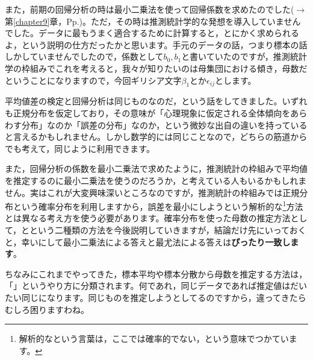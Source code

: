 \documentclass{ltjbook}
\begin{document}
また，前期の回帰分析の時は最小二乗法を使って回帰係数を求めたのでした($\to$第\ref{chapter9}章，Pp.\pageref{LeastSquare})。ただ，その時は推測統計学的な発想を導入していませんでした。データに最もうまく適合するために計算すると，とにかく求められるよ，という説明の仕方だったかと思います。手元のデータの話，つまり標本の話しかしていませんでしたので，係数として$b_0,b_1$と書いていたのですが，推測統計学の枠組みでこれを考えると，我々が知りたいのは母集団における傾き，母数だということになりますので，今回ギリシア文字$\beta_1$とか$\epsilon_{ij}$とします。

平均値差の検定と回帰分析は同じものなのだ，という話をしてきました。いずれも正規分布を仮定しており，その意味が「心理現象に仮定される全体傾向をあらわす分布」なのか「誤差の分布」なのか，という微妙な出自の違いを持っていると言えるかもしれません。しかし数学的には同じことなので，どちらの筋道からでも考えて，同じように利用できます。

また，回帰分析の係数を最小二乗法で求めたように，推測統計の枠組みで平均値を推定するのに最小二乗法を使うのだろうか，と考えている人もいるかもしれません。実はこれが大変興味深いところなのですが，推測統計の枠組みでは正規分布という確率分布を利用しますから，誤差を最小にしようという解析的な\footnote{解析的なという言葉は，ここでは確率的でない，という意味でつかています。}方法とは異なる考え方を使う必要があります。確率分布を使った母数の推定方法として，とという二種類の方法を今後説明していきますが，結論だけ先にいっておくと，幸いにして最小二乗法による答えと最尤法による答えは\textbf{ぴったり一致します}。

ちなみにこれまでやってきた，標本平均や標本分散から母数を推定する方法は，「」というやり方に分類されます。何であれ，同じデータであれば推定値はだいたい同じになります。同じものを推定しようとしてるのですから，違ってきたらむしろ困りますわね。
\end{document}
